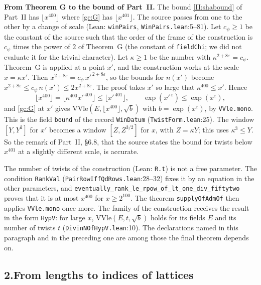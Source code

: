 \documentclass[11pt,letterpaper]{article}
\begin{document}
\textbf{From Theorem G to the bound of Part~II.} The bound \eqref{II:shabound} of Part~II has $\lfloor x^{400}\rfloor$
where \eqref{gc:G} has $\lfloor x^{401}\rfloor$. The source passes from one to the other by a change of scale
(Lean: \texttt{winPairs},
\texttt{WinPairs.lean}:5--81). Let $c_\psi\ge1$ be the constant of the
source such that the order of the frame of the construction is $c_\psi$ times the power of $2$ of
Theorem~G (the constant of \texttt{fieldChi}; we did not evaluate it for the trivial character). Let $\kappa\ge1$ be the
number with $\kappa^{2+8\varepsilon}=c_\psi$. Theorem~G is applied at a point $x'$, and the construction
works at the scale $x=\kappa x'$. Then $x^{2+8\varepsilon}=c_\psi\,x'^{\,2+8\varepsilon}$, so the bounds for
$n(x')$ become $x^{2+8\varepsilon}\le c_\psi\,n(x')\le2x^{2+8\varepsilon}$. The proof takes $x'$ so large
that $\kappa^{400}\le x'$. Hence
\begin{equation}\label{D:333}
 \lfloor x^{400}\rfloor=\lfloor\kappa^{400}x'^{\,400}\rfloor\le\lfloor x'^{\,401}\rfloor,\qquad
 \exp(x'^{\,\varepsilon})\le\exp(x^{\varepsilon}),
\end{equation}
and \eqref{gc:G} at $x'$ gives $\mathrm{VVle}(E,\lfloor x^{400}\rfloor,\sqrt b)$ with $b=\exp(x^\varepsilon)$,
by \texttt{VVle.mono}. This is the field \texttt{bound} of the record \texttt{WinDatum}
(\texttt{TwistForm.lean}:25). The window $[Y,Y^2]$ for $x'$ becomes a window $[Z,Z^{3/2}]$ for $x$, with
$Z=\kappa Y$; this uses $\kappa^{3}\le Y$. So the remark of Part~II, \S6.8, that the source states the bound
for twists below $x^{401}$ at a slightly different scale, is accurate.

The number of twists of the construction (Lean: \texttt{R.t}) is not a free parameter. The condition
\texttt{RankVal} (\texttt{PairRowIffQdRows.lean}:28--32) fixes it by an equation in the other parameters, and
\texttt{eventually\_rank\_le\_}\allowbreak\texttt{rpow\_of\_lt\_one\_div\_fiftytwo} proves that it is at most $x^{400}$ for
$x\ge2^{100}$. The theorem \texttt{supplyOfAdmOf} then applies \texttt{VVle.mono} once more. The family of
the construction receives the result in the form \texttt{HypV}: for large $x$,
$\mathrm{VVle}(E,t,\sqrt b)$ holds for its fields $E$ and its number of twists $t$
(\texttt{DivinNOfHypV.lean}:10). The declarations named in this paragraph and in the preceding one are
among those the final theorem depends on.

\subsection*{2.\quad From lengths to indices of lattices}
\end{document}

